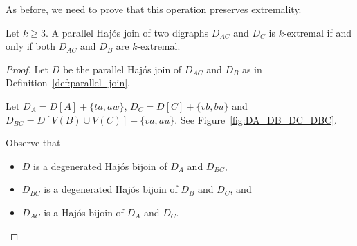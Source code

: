 As before, we need to prove that this operation preserves extremality.

\begin{lemma}\label{lem:extremal_parallel_Haj}
    Let $k \geq 3$. A parallel Haj\'os join of two digraphs $D_{AC}$ and $D_C$ is $k$-extremal if and only if both $D_{AC}$ and $D_{B}$ are $k$-extremal.
\end{lemma}

\begin{proof} 
    Let $D$ be the parallel Haj\'os join of $D_{AC}$ and $D_{B}$ as in Definition~\ref{def:parallel_join}. 
    
    Let $D_A = D[A] + \{ta,aw\}$, $D_{C} = D[C] + \{vb,bu\}$ and $D_{BC} = D[V(B) \cup V(C)] + \{va,au\}$. See Figure~\ref{fig:DA_DB_DC_DBC}. 

    
    Observe that 
    \begin{itemize}
        \item $D$ is a degenerated Haj\'os bijoin of $D_{A}$ and $D_{BC}$, 
        \item $D_{BC}$ is a degenerated Haj\'os bijoin of $D_{B}$ and $D_{C}$, and
        \item $D_{AC}$ is a Haj\'os bijoin of $D_{A}$ and $D_{C}$.  
    \end{itemize}


    
    

    
    

\end{proof}
